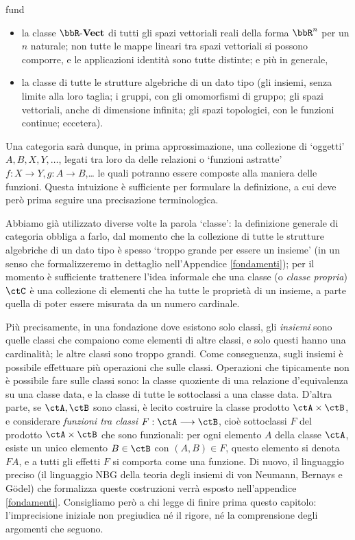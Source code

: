 \begin{hExample}{fund}
	\begin{itemize}
		\item {} la classe \(\ctVect[\bbR]\) di tutti gli spazi vettoriali reali della forma \(\bbR^n\) per un \(n\) naturale; non tutte le mappe lineari tra spazi vettoriali si possono comporre, e le applicazioni identità sono tutte distinte; e più in generale,
		\item la classe di tutte le strutture algebriche di un dato tipo (gli insiemi, senza limite alla loro taglia; i gruppi, con gli omomorfismi di gruppo; gli spazi vettoriali, anche di dimensione infinita; gli spazi topologici, con le funzioni continue; eccetera).
	\end{itemize}
\end{hExample}
Una categoria sarà dunque, in prima approssimazione, una collezione di `oggetti' \(A,B,X,Y,\dots\), legati tra loro da delle relazioni o `funzioni astratte' \(f : X\to Y, g : A\to B\),\dots{} le quali potranno essere composte alla maniera delle funzioni. Questa intuizione è sufficiente per formulare la definizione, a cui deve però prima seguire una precisazione terminologica.
\begin{remark}
	Abbiamo già utilizzato diverse volte la parola `classe': la definizione generale di categoria obbliga a farlo, dal momento che la collezione di tutte le strutture algebriche di un dato tipo è spesso `troppo grande per essere un insieme' (in un senso che formalizzeremo in dettaglio nell'Appendice \ref{fondamenti}); per il momento è sufficiente trattenere l'idea informale che una classe (o \emph{classe propria}) \(\ctC\) è una collezione di elementi che ha tutte le proprietà di un insieme, a parte quella di poter essere misurata da un numero cardinale.

	Più precisamente, in una fondazione dove esistono solo classi, gli \emph{insiemi} sono quelle classi che compaiono come elementi di altre classi, e solo questi hanno una cardinalità; le altre classi sono troppo grandi. Come conseguenza, sugli insiemi è possibile effettuare più operazioni che sulle classi. Operazioni che tipicamente non è possibile fare sulle classi sono: la classe quoziente di una relazione d'equivalenza su una classe data, e la classe di tutte le sottoclassi a una classe data.
	D'altra parte, se \(\ctA,\ctB\) sono classi, è lecito costruire la classe prodotto \(\ctA\times\ctB\), e considerare \emph{funzioni tra classi} \(F : \ctA\fun\ctB\), cioè sottoclassi \(F\) del prodotto \(\ctA\times\ctB\) che sono funzionali: per ogni elemento \(A\) della classe \(\ctA\), esiste un unico elemento \(B\in\ctB\) con \((A,B)\in F\), questo elemento si denota \(FA\), e a tutti gli effetti \(F\) si comporta come una funzione. Di nuovo, il linguaggio preciso (il linguaggio \textsf{NBG} della teoria degli insiemi di von Neumann, Bernays e G\"odel) che formalizza queste costruzioni verrà esposto nell'appendice \ref{fondamenti}. Consigliamo però a chi legge di finire prima questo capitolo: l'imprecisione iniziale non pregiudica né il rigore, né la comprensione degli argomenti che seguono.
\end{remark}
